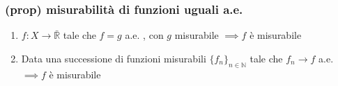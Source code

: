 \subsubsection{(prop) misurabilità di funzioni uguali a.e.}
\begin{enumerate}
    \item $f:X\to \bar{\mathbb R}$ tale che $f=g$ a.e. , con $g$ misurabile $\implies f$ è misurabile 
    \item Data una successione di funzioni misurabili $\{f_n\}_{n\in \mathbb N}$ tale che $f_n\to f$ a.e. $\implies f$ è misurabile
\end{enumerate}
\newpage
